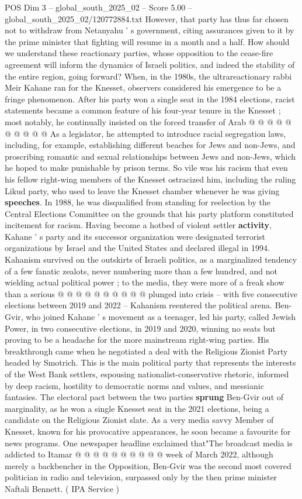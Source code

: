 \begin{textsample}{POS Dim 3 – global\_south\_2025\_02 – Score 5.00 – global\_south\_2025\_02/120772884.txt}
However, that party has thus far chosen not to withdraw from Netanyahu ' s government, citing assurances given to it by the prime minister that fighting will resume in a month and a half.
How should we understand these reactionary parties, whose opposition to the cease-fire agreement will inform the dynamics of Israeli politics, and indeed the stability of the entire region, going forward?
When, in the 1980s, the ultrareactionary rabbi Meir Kahane ran for the Knesset, observers considered his emergence to be a fringe phenomenon.
After his party won a single seat in the 1984 elections, racist statements became a common feature of his four-year tenure in the Knesset ; most notably, he continually insisted on the forced transfer of Arab @ @ @ @ @ @ @ @ @ @ As a legislator, he attempted to introduce racial segregation laws, including, for example, establishing different beaches for Jews and non-Jews, and proscribing romantic and sexual relationships between Jews and non-Jews, which he hoped to make punishable by prison terms.
So vile was his racism that even his fellow right-wing members of the Knesset ostracized him, including the ruling Likud party, who used to leave the Knesset chamber whenever he was giving \textbf{speeches}.
In 1988, he was disqualified from standing for reelection by the Central Elections Committee on the grounds that his party platform constituted incitement for racism.
Having become a hotbed of violent settler \textbf{activity}, Kahane ' s party and its successor organization were designated terrorist organizations by Israel and the United States and declared illegal in 1994.
Kahanism survived on the outskirts of Israeli politics, as a marginalized tendency of a few fanatic zealots, never numbering more than a few hundred, and not wielding actual political power ; to the media, they were more of a freak show than a serious @ @ @ @ @ @ @ @ @ @ plunged into crisis -- with five consecutive elections between 2019 and 2022 -- Kahanism reentered the political arena.
Ben-Gvir, who joined Kahane ' s movement as a teenager, led his party, called Jewish Power, in two consecutive elections, in 2019 and 2020, winning no seats but proving to be a headache for the more mainstream right-wing parties.
His breakthrough came when he negotiated a deal with the Religious Zionist Party headed by Smotrich.
This is the main political party that represents the interests of the West Bank settlers, espousing nationalist-conservative rhetoric, informed by deep racism, hostility to democratic norms and values, and messianic fantasies.
The electoral pact between the two parties \textbf{sprung} Ben-Gvir out of marginality, as he won a single Knesset seat in the 2021 elections, being a candidate on the Religious Zionist slate.
As a very media savvy Member of Knesset, known for his provocative appearances, he soon became a favourite for news programs.
One newspaper headline exclaimed that"The broadcast media is addicted to Itamar @ @ @ @ @ @ @ @ @ @ week of March 2022, although merely a backbencher in the Opposition, Ben-Gvir was the second most covered politician in radio and television, surpassed only by the then prime minister Naftali Bennett. ( IPA Service )


\end{textsample}
